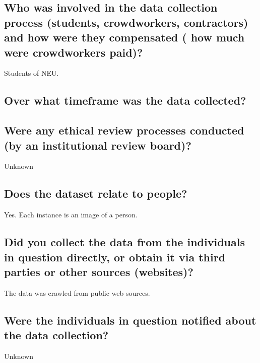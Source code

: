 \subsection*{Who was involved in the data collection process (\eg students, crowdworkers, contractors) and how were they compensated (\eg
how much were crowdworkers paid)?}

\noindent Students of NEU.

\subsection*{Over what timeframe was the data collected?}




\subsection*{Were any ethical review processes conducted (\eg by an institutional review board)?}
\noindent Unknown


\subsection*{Does the dataset relate to people?}
\noindent Yes. Each instance is an image of a person.

\subsection*{Did you collect the data from the individuals in question directly, or obtain it via third parties or other sources (\eg websites)?}
\noindent The data was crawled from public web sources.

\subsection*{Were the individuals in question notified about the data collection?}
\noindent Unknown

